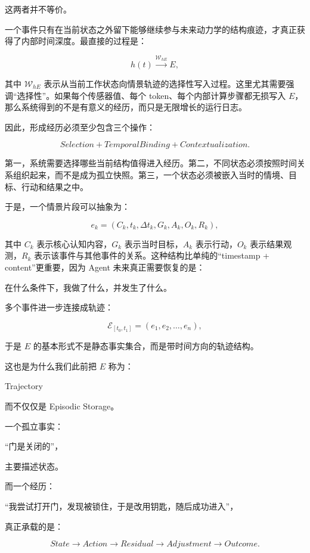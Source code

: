 这两者并不等价。

一个事件只有在当前状态之外留下能够继续参与未来动力学的结构痕迹，才真正获得了内部时间深度。最直接的过程是：

\[
h(t)
\xrightarrow{\mathcal{W}_{hE}}
E,
\]

其中 $\mathcal{W}_{hE}$ 表示从当前工作状态向情景轨迹的选择性写入过程。这里尤其需要强调“选择性”。如果每个传感器值、每个 token、每个内部计算步骤都无损写入 $E$，那么系统得到的不是有意义的经历，而只是无限增长的运行日志。

因此，形成经历必须至少包含三个操作：

\[
\boxed{
Selection
+
TemporalBinding
+
Contextualization.
}
\]

第一，系统需要选择哪些当前结构值得进入经历。第二，不同状态必须按照时间关系组织起来，而不是成为孤立快照。第三，一个状态必须被嵌入当时的情境、目标、行动和结果之中。

于是，一个情景片段可以抽象为：

\[
e_k
=
\left(
C_k,
t_k,
\Delta t_k,
G_k,
A_k,
O_k,
R_k
\right),
\]

其中 $C_k$ 表示核心认知内容，$G_k$ 表示当时目标，$A_k$ 表示行动，$O_k$ 表示结果观测，$R_k$ 表示该事件与其他事件的关系。这种结构比单纯的“timestamp + content”更重要，因为 Agent 未来真正需要恢复的是：

\begin{statementbox}
在什么条件下，我做了什么，并发生了什么。
\end{statementbox}

多个事件进一步连接成轨迹：

\[
\mathcal{E}_{[t_0,t_1]}
=
(e_1,e_2,\ldots,e_n),
\]

于是 $E$ 的基本形式不是静态事实集合，而是带时间方向的轨迹结构。

这也是为什么我们此前把 $E$ 称为：

\begin{statementbox}
Trajectory
\end{statementbox}

而不仅仅是 Episodic Storage。

一个孤立事实：

“门是关闭的”，

主要描述状态。

而一个经历：

“我尝试打开门，发现被锁住，于是改用钥匙，随后成功进入”，

真正承载的是：

\[
State
\rightarrow
Action
\rightarrow
Residual
\rightarrow
Adjustment
\rightarrow
Outcome.
\]

